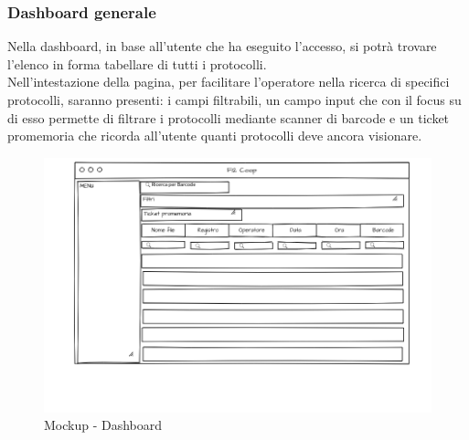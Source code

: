 \subsubsection{Dashboard generale}
Nella dashboard, in base all'utente che ha eseguito l'accesso, si potrà trovare l'elenco in forma tabellare di tutti i protocolli.
\\
Nell'intestazione della pagina, per facilitare l'operatore nella ricerca di specifici protocolli, saranno presenti: i campi filtrabili, un campo input che con il focus su di esso permette di filtrare i protocolli mediante scanner di barcode e un ticket promemoria che ricorda all'utente quanti protocolli deve ancora visionare.
\begin{figure}[!h] 
    \centering 
    \includegraphics[width=1\columnwidth]{immagini/mockup/Dashboard.png}
    \caption{Mockup - Dashboard}
\end{figure}
\newpage

